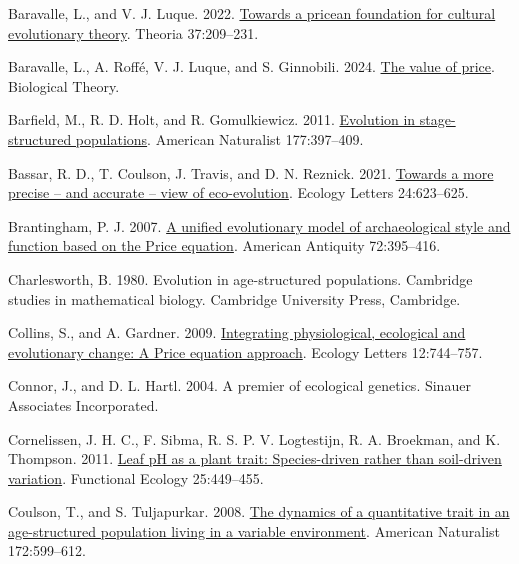 \documentclass[
]{article}
\newlength{\cslhangindent}
\newenvironment{CSLReferences}[2] %
 {\begin{list}{}{%
  \setlength{\itemindent}{0pt}
  \setlength{\leftmargin}{0pt}
  \setlength{\parsep}{0pt}
  \ifodd #1
   \setlength{\leftmargin}{\cslhangindent}
   \setlength{\itemindent}{-1\cslhangindent}
  \fi
  \setlength{\itemsep}{#2\baselineskip}}}
 {\end{list}}
\begin{document}
\label{refs}
\begin{CSLReferences}{0}{0}
Baravalle, L., and V. J. Luque. 2022.
\href{https://doi.org/10.1387/theoria.21940}{Towards a pricean
foundation for cultural evolutionary theory}. Theoria 37:209--231.

Baravalle, L., A. Roffé, V. J. Luque, and S. Ginnobili. 2024.
\href{https://doi.org/10.1007/s13752-024-00482-4}{The value of price}.
Biological Theory.

Barfield, M., R. D. Holt, and R. Gomulkiewicz. 2011.
\href{https://doi.org/10.1086/658903}{Evolution in stage-structured
populations}. American Naturalist 177:397--409.

Bassar, R. D., T. Coulson, J. Travis, and D. N. Reznick. 2021.
\href{https://doi.org/10.1111/ele.13712}{Towards a more precise -- and
accurate -- view of eco-evolution}. Ecology Letters 24:623--625.

Brantingham, P. J. 2007. \href{https://doi.org/10.2307/40035853}{{A
unified evolutionary model of archaeological style and function based on
the Price equation}}. American Antiquity 72:395--416.

Charlesworth, B. 1980. Evolution in age-structured populations.
Cambridge studies in mathematical biology. Cambridge University Press,
Cambridge.

Collins, S., and A. Gardner. 2009.
\href{https://doi.org/10.1111/j.1461-0248.2009.01340.x}{{Integrating
physiological, ecological and evolutionary change: A Price equation
approach}}. Ecology Letters 12:744--757.

Connor, J., and D. L. Hartl. 2004. {A premier of ecological genetics}.
Sinauer Associates Incorporated.

Cornelissen, J. H. C., F. Sibma, R. S. P. V. Logtestijn, R. A. Broekman,
and K. Thompson. 2011.
\href{https://doi.org/10.1111/j.1365-2435.2010.01765.x}{Leaf pH as a
plant trait: Species-driven rather than soil-driven variation}.
Functional Ecology 25:449--455.

Coulson, T., and S. Tuljapurkar. 2008.
\href{https://doi.org/10.1086/591693}{The dynamics of a quantitative
trait in an age-structured population living in a variable environment}.
American Naturalist 172:599--612.


\end{CSLReferences}
\end{document}
